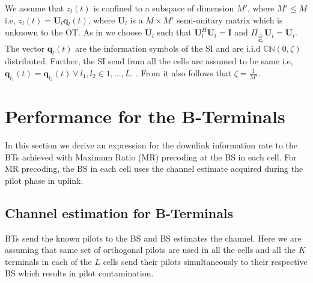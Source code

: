 \documentclass[10pt, a4paper, twoside,fleqn]{article}
\begin{document}
We assume that $z_l(t)$ is confined to a subspace of dimension $M'$, where $M'\leq M$ i.e, $z_l(t) = \pmb{U}_l\pmb{q}_l(t)$, where $\pmb{U}_l$ is a $M\times M'$ semi-unitary matrix which is unknown to the OT. As in \cite{bib:jbb} we choose $\pmb{U}_l$ such that $\pmb{U}_l^H\pmb{U}_l=\pmb{I}$ and $\Pi_{\frac{1}{\pmb{\widehat{G}}_l}}\pmb{U}_l=\pmb{U}_l$. The vector $\pmb{q}_l(t)$ are the information symbols of the SI and are i.i.d ${\mathbb C}{\mathbb N}(0,\zeta)$ distributed. Further, the SI send from all the cells are assumed to be same i.e, $\pmb{q}_{l_1}(t) = \pmb{q}_{l_2}(t) \ \forall \ l_1,l_2 \in {1 ,\dotsc, L}$. . From \cite{bib:jbb} it also follows that $\zeta=\frac{1}{M'}$. 
\section{Performance for the B-Terminals}
In this section we derive an  expression for the downlink information rate to the BTs achieved with Maximum Ratio (MR) precoding at the BS in each cell. For MR precoding, the BS in each cell uses the channel estimate acquired during the pilot phase in uplink.  

\subsection{Channel estimation for B-Terminals} \label{sec:btchesti}
	BTs send the known pilots to the BS and BS estimates the channel. Here we are assuming that same set of orthogonal pilots are used in all the cells and all the $K$ terminals in each of the $L$ cells send their pilots simultaneously to their respective BS which results in pilot contamination.
\end{document}
